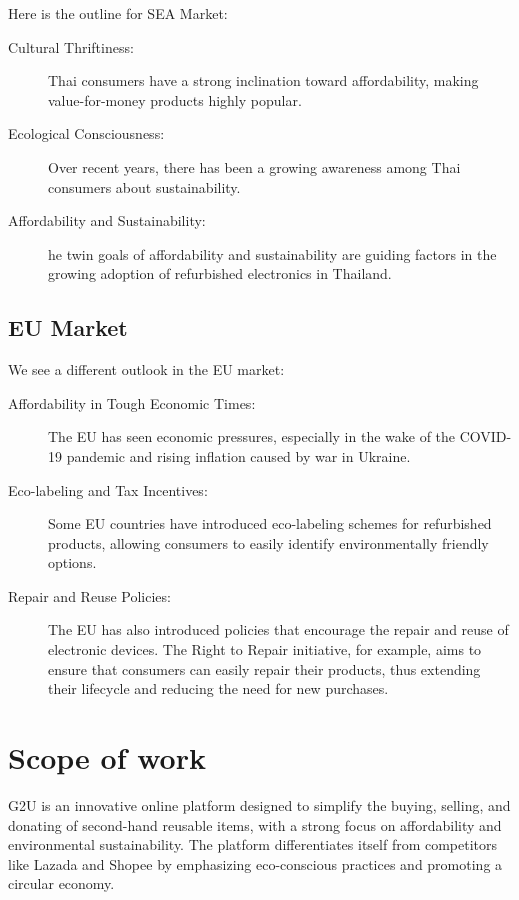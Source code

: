 Here is the outline for SEA Market:

\begin{description}
	\item[Cultural Thriftiness:] Thai consumers have a strong inclination toward affordability, making value-for-money products highly popular.
	\item[Ecological Consciousness:] Over recent years, there has been a growing awareness among Thai consumers about sustainability. 
	\item[Affordability and Sustainability:] he twin goals of affordability and sustainability are guiding factors in the growing adoption of refurbished electronics in Thailand. 
\end{description}

\subsection{EU Market}

We see a different outlook in the EU market:

\begin{description}
	\item[Affordability in Tough Economic Times:]  The EU has seen economic pressures, especially in the wake of the COVID-19 pandemic and rising inflation caused by war in Ukraine.
	 \item[Eco-labeling and Tax Incentives: ] Some EU countries have introduced eco-labeling schemes for refurbished products, allowing consumers to easily identify environmentally friendly options.
	 \item[Repair and Reuse Policies: ]  The EU has also introduced policies that encourage the repair and reuse of electronic devices. The Right to Repair initiative, for example, aims to ensure that consumers can easily repair their products, thus extending their lifecycle and reducing the need for new purchases.
\end{description}

\section{Scope of work}

G2U is an innovative online platform designed to simplify the buying, selling, and donating of second-hand reusable items, with a strong focus on affordability and environmental sustainability. The platform differentiates itself from competitors like Lazada and Shopee by emphasizing eco-conscious practices and promoting a circular economy.

